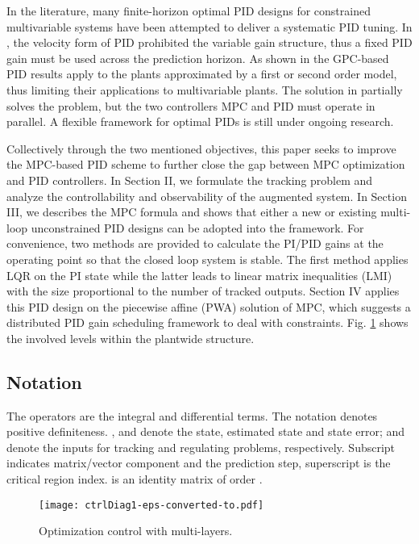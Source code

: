 \documentclass[5p,authoryear,times]{elsarticle}
\begin{document}
In the literature, many finite-horizon optimal PID designs for constrained multivariable systems have been attempted to deliver a systematic PID tuning. In \citet{Mor03}, the velocity form of PID prohibited the variable gain structure, thus a fixed PID gain must be used across the prediction horizon. As shown in \citet{Camacho03Model,Aro08,Sat12} the GPC-based PID results apply to the plants approximated by a first or second order model, thus limiting their applications to multivariable plants. The solution in \citet{Di10Model} partially solves the problem, but the two controllers MPC and PID must operate in parallel. A flexible framework for optimal PIDs is still under ongoing research.

Collectively through the two mentioned objectives, this paper seeks to improve the MPC-based PID scheme to further close the gap between MPC optimization and PID controllers. In Section II, we formulate the tracking problem and analyze the controllability and observability of the augmented system. In Section III, we describes the MPC formula and shows that either a new or existing multi-loop unconstrained PID designs can be adopted into the framework. For convenience, two methods are provided to calculate the PI/PID gains at the operating point so that the closed loop system is stable. The first method applies LQR on the PI state while the latter leads to linear matrix inequalities (LMI) with the size proportional to the number of tracked outputs. Section IV applies this PID design on the piecewise affine (PWA) solution of MPC, which suggests a distributed PID gain scheduling framework to deal with constraints. Fig. \ref{fig1} shows the involved levels within the plantwide structure.

\subsection*{Notation}
The operators  are the integral and differential terms. The notation  denotes positive definiteness. ,  and  denote the state, estimated state and state error;  and  denote the inputs for tracking and regulating problems, respectively. Subscript  indicates matrix/vector component and  the prediction step, superscript  is the critical region index.  is an identity matrix of order . 

\begin{figure}[t]
\centering
\texttt{[image: ctrlDiag1-eps-converted-to.pdf]}
\caption{Optimization control with multi-layers.}
\label{fig1}
\end{figure}
\end{document}
